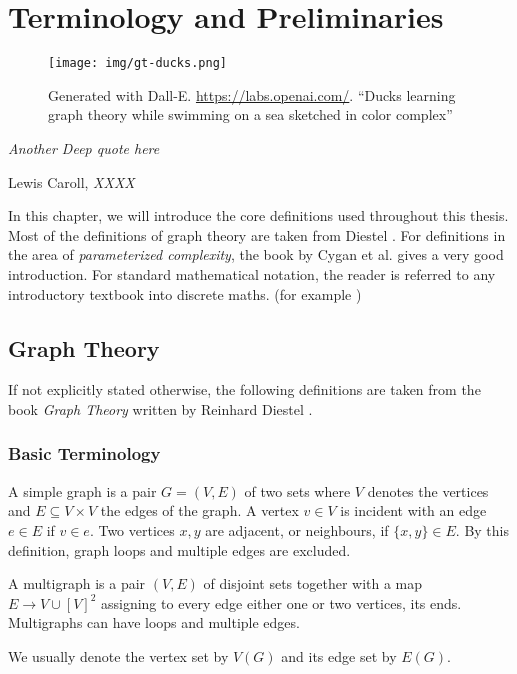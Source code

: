 \chapter{Terminology and Preliminaries}\label{ch:prelim}

\vspace*{-50pt}

\begin{figure}[ht]
        \texttt{[image: img/gt-ducks.png]}
        \captionsetup{textformat=empty,labelformat=blank}
        \caption{Generated with Dall-E. \url{https://labs.openai.com/}. ``Ducks learning graph theory while swimming on a sea sketched in color complex''}
\end{figure}

\epigraph{\itshape Another Deep quote here}{Lewis Caroll, \textit{XXXX}}


In this chapter, we will introduce the core definitions used throughout this thesis. 
Most of the definitions of graph theory are taken from Diestel \cite{Diekert2005}. 
For definitions in the area of \textit{parameterized complexity}, the book by Cygan et al.\cite{Cygan2015} gives a very good introduction.
For standard mathematical notation, the reader is referred to any introductory textbook into discrete maths. (for example \cite{Rosen2012})

\section{Graph Theory}

If not explicitly stated otherwise, the following definitions are taken from the book \textit{Graph Theory} written by Reinhard Diestel \cite{diestel10}.

\subsection{Basic Terminology}

\begin{definition}[Graph]
    A simple graph is a pair $G = (V, E)$ of two sets where $V$ denotes the vertices and $E \subseteq V \times V$ the edges of the graph.  A vertex $v \in V$ is incident with an edge $e \in E$ if $v \in e$. Two vertices $x, y$ are adjacent, or neighbours, if $\{x,y \} \in E$. By this definition, graph loops and multiple edges are excluded.
    
    A multigraph is a pair $(V, E)$ of disjoint sets together with a map $E \rightarrow V \cup [V]^2$ assigning to every edge either one or two vertices, its ends. Multigraphs can have loops and multiple edges.
    
    We usually denote the vertex set by $V(G)$ and its edge set by $E(G)$.



\end{definition}

